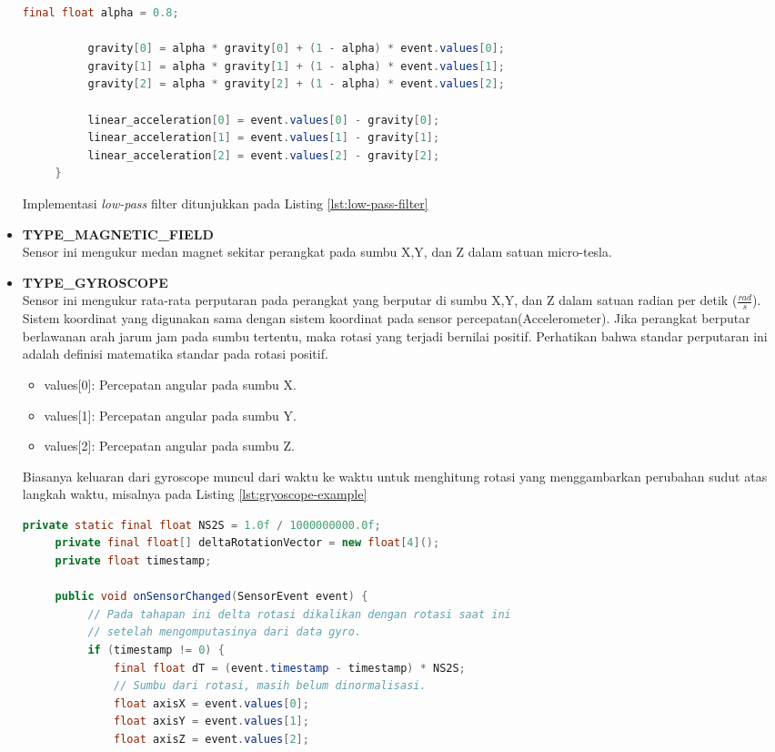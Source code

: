 \begin{itemize}
\begin{lstlisting}[caption={Implementasi \textit{low-pass} filter},label={lst:low-pass-filter},language=java]
          final float alpha = 0.8;

          gravity[0] = alpha * gravity[0] + (1 - alpha) * event.values[0];
          gravity[1] = alpha * gravity[1] + (1 - alpha) * event.values[1];
          gravity[2] = alpha * gravity[2] + (1 - alpha) * event.values[2];

          linear_acceleration[0] = event.values[0] - gravity[0];
          linear_acceleration[1] = event.values[1] - gravity[1];
          linear_acceleration[2] = event.values[2] - gravity[2];
     }
\end{lstlisting}
Implementasi \textit{low-pass} filter ditunjukkan pada Listing \ref{lst:low-pass-filter}\\
\item \textbf{TYPE\_MAGNETIC\_FIELD}\\
Sensor ini mengukur medan magnet sekitar perangkat pada sumbu X,Y, dan Z dalam satuan micro-tesla.\\
\item \textbf{TYPE\_GYROSCOPE}\\
Sensor ini mengukur rata-rata perputaran pada perangkat yang berputar di sumbu X,Y, dan Z dalam satuan radian per detik ($\frac{rad}{s}$). Sistem koordinat yang digunakan sama dengan sistem koordinat pada sensor percepatan(Accelerometer). Jika perangkat berputar berlawanan arah jarum jam pada sumbu tertentu, maka rotasi yang terjadi bernilai positif. Perhatikan bahwa standar perputaran ini adalah definisi matematika standar pada rotasi positif.
\begin{itemize}
	\item values[0]: Percepatan angular pada sumbu X.
	\item values[1]: Percepatan angular pada sumbu Y.
	\item values[2]: Percepatan angular pada sumbu Z.
\end{itemize}
Biasanya keluaran dari gyroscope muncul dari waktu ke waktu untuk menghitung rotasi yang menggambarkan perubahan sudut atas langkah waktu, misalnya pada Listing \ref{lst:gryoscope-example}
\begin{lstlisting}[caption=contoh implementasi gyroscope,label={lst:gryoscope-example},language=java]
	  private static final float NS2S = 1.0f / 1000000000.0f;
     private final float[] deltaRotationVector = new float[4]();
     private float timestamp;

     public void onSensorChanged(SensorEvent event) {
          // Pada tahapan ini delta rotasi dikalikan dengan rotasi saat ini
          // setelah mengomputasinya dari data gyro.
          if (timestamp != 0) {
              final float dT = (event.timestamp - timestamp) * NS2S;
              // Sumbu dari rotasi, masih belum dinormalisasi.
              float axisX = event.values[0];
              float axisY = event.values[1];
              float axisZ = event.values[2];


\end{lstlisting}
\end{itemize}

